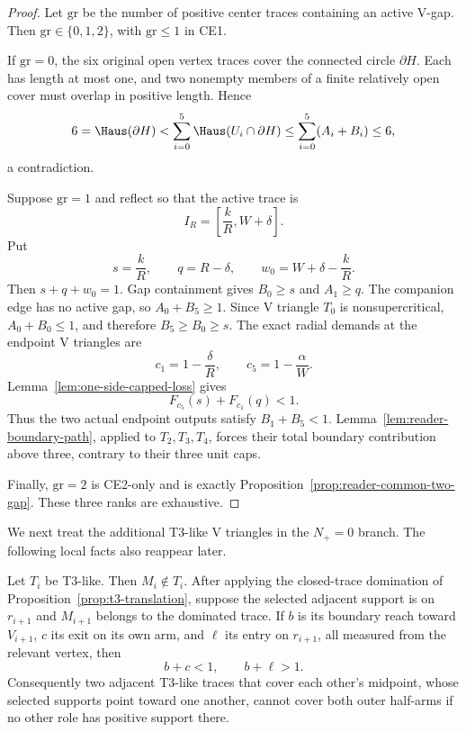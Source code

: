 \begin{proof}
Let $\mathrm{gr}$ be the number of positive center traces containing an active
V-gap.  Then $\mathrm{gr}\in\{0,1,2\}$, with
$\mathrm{gr}\le1$ in CE1.

If $\mathrm{gr}=0$, the six original open vertex traces cover the connected circle
$\partial H$.  Each has length at most one, and two nonempty members of a
finite relatively open cover must overlap in positive length.  Hence
\[
 6=\Haus(\partial H)
 <\sum_{i=0}^5\Haus(U_i\cap\partial H)
 \le\sum_{i=0}^5(A_i+B_i)\le6,
\]
a contradiction.

Suppose $\mathrm{gr}=1$ and reflect so that the active trace is
\[
 I_R=\left[\frac{k}{R},W+\delta\right].
\]
Put
\[
 s=\frac{k}{R},\qquad q=R-\delta,
 \qquad w_0=W+\delta-\frac{k}{R}.
\]
Then $s+q+w_0=1$.  Gap containment gives $B_0\ge s$ and $A_1\ge q$.
The companion edge has no active gap, so $A_0+B_5\ge1$.  Since V triangle $T_0$ is
nonsupercritical, $A_0+B_0\le1$, and therefore $B_5\ge B_0\ge s$.  The exact
radial demands at the endpoint V triangles are
\[
 c_1=1-\frac{\delta}{R},
 \qquad
 c_5=1-\frac{\alpha}{W}.
\]
Lemma~\ref{lem:one-side-capped-loss} gives
\[
 F_{c_5}(s)+F_{c_1}(q)<1.
\]
Thus the two actual endpoint outputs satisfy $B_1+B_5<1$.
Lemma~\ref{lem:reader-boundary-path}, applied to $T_2,T_3,T_4$, forces their
total boundary contribution above three, contrary to their three unit caps.

Finally, $\mathrm{gr}=2$ is CE2-only and is exactly
Proposition~\ref{prop:reader-common-two-gap}.  These three ranks are exhaustive.
\end{proof}

We next treat the additional T3-like V triangles in the $N_+=0$ branch.  The
following local facts also reappear later.

\begin{lemma}
\label{lem:t3-midpoint-tradeoff}
Let $T_i$ be T3-like.  Then $M_i\notin T_i$.  After applying the closed-trace
domination of Proposition~\ref{prop:t3-translation}, suppose the selected
adjacent support is on $r_{i+1}$ and $M_{i+1}$ belongs to the dominated
trace.  If $b$ is its boundary reach toward $V_{i+1}$, $c$ its exit on its
own arm, and $\ell$ its entry on $r_{i+1}$, all measured from the relevant
vertex, then
\begin{equation}
 b+c<1,\qquad b+\ell>1.
 \label{eq:t3-side-tradeoff}
\end{equation}
Consequently two adjacent T3-like traces that cover each other's midpoint,
whose selected supports point toward one another, cannot cover both outer
half-arms if no other role has positive support there.
\end{lemma}

